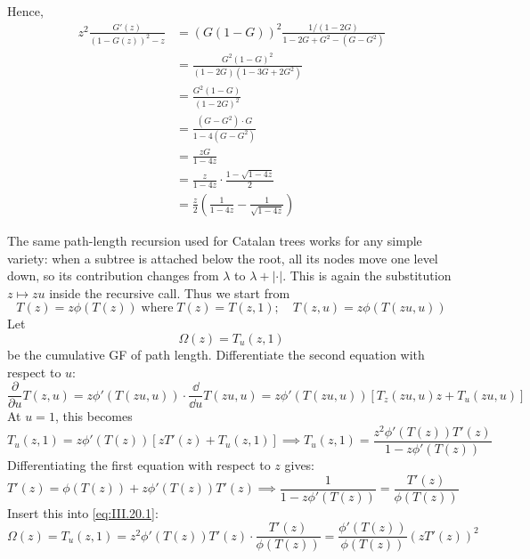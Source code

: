 Hence,
\begin{equation*}
    \begin{aligned}
        z^{2} \frac{G'(z)}{(1 - G(z))^{2} - z}
        &= (G(1 - G))^{2} \frac{1/(1 - 2G)}{1 - 2G + G^{2} - (G - G^{2})} \\
        &= \frac{G^{2}(1 - G)^{2}}{(1 - 2G)(1 - 3G + 2G^{2})} \\
        &= \frac{G^{2}(1 - G)}{(1 - 2G)^{2}} \\
        &= \frac{(G - G^{2}) \cdot G}{1 - 4(G - G^{2})} \\
        &= \frac{zG}{1 - 4z} \\
        &= \frac{z}{1 - 4z} \cdot \frac{1 - \sqrt{1 - 4z}}{2} \\
        &= \frac{z}{2} \left(\frac{1}{1 - 4z} - \frac{1}{\sqrt{1 - 4z}}\right)
    \end{aligned}
\end{equation*}


The same path-length recursion used for Catalan trees works for any simple variety:
when a subtree is attached below the root, all its nodes move one level down, so its contribution
changes from $\lambda$ to $\lambda + |\cdot|$. This is again the substitution $z\mapsto zu$
inside the recursive call. Thus we start from
\begin{equation*}
    T(z) = z\phi(T(z)) \; \text{where} \; T(z) = T(z, 1); \quad
    T(z, u) = z\phi(T(zu, u))
\end{equation*}
Let
\begin{equation*}
    \Omega(z) = T_u(z,1)
\end{equation*}
be the cumulative GF of path length.
Differentiate the second equation with respect to $u$:
\begin{equation*}
    \frac{\partial}{\partial u} T(z, u)
        = z\phi'(T(zu, u)) \cdot \frac{\dd}{\dd u} T(zu, u) = z\phi'(T(zu, u))[T_z(zu, u)z + T_u(zu, u)]
\end{equation*}
At $u = 1$, this becomes
\begin{equation} \label{eq:III.20.1}
    T_u(z, 1) = z\phi'(T(z))[zT'(z) + T_u(z, 1)] \implies T_u(z, 1) = \frac{z^{2}\phi'(T(z))T'(z)}{1 - z\phi'(T(z))}
\end{equation}
Differentiating the first equation with respect to $z$ gives:
\begin{equation*}
    T'(z) = \phi(T(z)) + z\phi'(T(z))T'(z) \implies \frac{1}{1 - z\phi'(T(z))} = \frac{T'(z)}{\phi(T(z))}
\end{equation*}
Insert this into \eqref{eq:III.20.1}:
\begin{equation*}
    \Omega(z) = T_u(z, 1) = z^{2}\phi'(T(z))T'(z) \cdot \frac{T'(z)}{\phi(T(z))} = \frac{\phi'(T(z))}{\phi(T(z))}(zT'(z))^{2}
\end{equation*}

